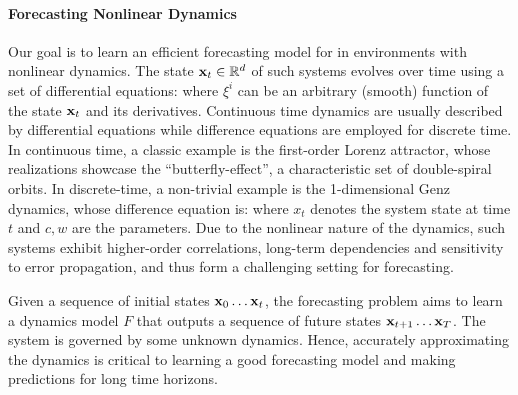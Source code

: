 \paragraph{Forecasting Nonlinear Dynamics}
%
Our goal is to learn an efficient forecasting model for  in environments with nonlinear dynamics.
%
The state ${\mathbf{x}}_t \in \mathbb{R}^d$ of such systems evolves over time using a set of  differential equations:
%
%
where $\xi^i$ can be an arbitrary (smooth) function of the state ${\mathbf{x}}_t$ and its derivatives. 
% 
Continuous time dynamics are usually described by differential equations while  difference equations are employed for discrete time. 
% 
In continuous time, a classic example is the first-order Lorenz attractor, whose realizations showcase the ``butterfly-effect'', a characteristic set of double-spiral orbits. 
% 
In discrete-time, a non-trivial example is the 1-dimensional Genz dynamics, whose difference equation is:
%
where $x_t$ denotes the system state at time $t$ and $c,w$ are the parameters. Due to the nonlinear nature of the dynamics, such systems exhibit higher-order correlations, long-term dependencies and sensitivity to error propagation, and thus form a challenging setting for forecasting.
% 

Given a sequence of initial states ${\mathbf{x}}_0\ldots {\mathbf{x}}_t$, the forecasting problem aims to learn a dynamics model $F$ that outputs a sequence of future states ${\mathbf{x}}_{t+1} \ldots {\mathbf{x}}_T$. 
The system is governed by some unknown dynamics. Hence, accurately approximating the dynamics is critical to learning a good forecasting model and making predictions for long time horizons.
 
